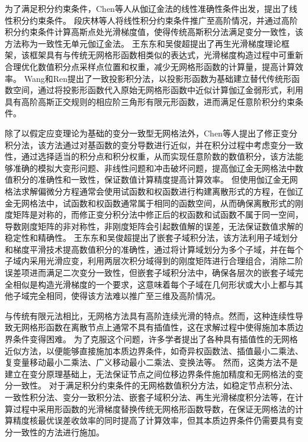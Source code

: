 为了满足积分约束条件，Chen等人从伽辽金法的线性准确性条件出发，提出了线性积分约束条件\textsuperscript{\cite{chen2001}}。
段庆林等人\textsuperscript{\cite{陈嵩涛2020几何非线性分析的高效高阶无网格法,duan2012}}将线性积分约束条件推广至高阶情况，并通过高阶积分约束条件计算高斯点处光滑梯度值，使得传统高斯积分法满足变分一致性，该方法称为一致性无单元伽辽金法。
王东东和吴俊超提出了再生光滑梯度理论框架\textsuperscript{\cite{wang2019}}，该框架具有与传统无网格形函数相类似的表达式，光滑梯度构造过程中可重新合理优化数值积分点采样点位置和权重，减少无网格形函数的计算量，提高计算效率。
Wang和Ren\textsuperscript{\cite{wang2023}}提出了一致投影积分法，以投影形函数为基础建立替代传统形函数空间，通过将投影形函数代入原始无网格形函数中近似计算伽辽金弱形式，利用具有高阶高斯正交规则的相应阶三角形有限元形函数，进而满足任意阶积分约束条件。\par
除了以假定应变理论为基础的变分一致型无网格法外，Chen等人\textsuperscript{\cite{chen1996}}提出了修正变分积分法，该方法通过对基函数的变分导数进行近似，并在积分过程中考虑变分一致性，通过选择适当的积分点和积分权重，从而实现任意阶数的数值积分，该方法能够准确的模拟大变形问题、非线性问题和冲击破坏问题，提高伽辽金无网格法中数值积分的准确性和一致性，保证数值计算精度提高计算效率。
但使用伽辽金无网格法求解偏微分方程通常会使用试函数和权函数进行构建离散形式的方程，在伽辽金无网格法中，试函数和权函数通常属于相同的函数空间，从而确保离散形式的刚度矩阵是对称的，而修正变分积分法中修正后的权函数和试函数不属于同一空间，导数刚度矩阵的非对称性，非刚度矩阵会引起数值解的误差，无法保证数值求解的稳定性和精确性。
王东东和吴俊超提出了嵌套子域积分法\textsuperscript{\cite{wang2016}}，该方法利用子域划分和梯度平滑技术提高数值积分的准确性，通过将计算域划分为多个子域，并在每个子域内采用光滑应变，利用两层次积分域得到的刚度矩阵进行合理组合，消除二阶误差项进而满足二次变分一致性，但嵌套子域积分法中，确保各层次的嵌套子域完全相似是构造光滑梯度的一个要求，这意味着每个子域在几何形状或大小上都与其他子域完全相同，使得该方法难以推广至三维及高阶情况。
\par
与传统有限元法相比，无网格方法具有高阶连续光滑的特点。然而，这种连续性导致无网格形函数在离散节点上通常不具有插值性，这在求解过程中使得施加本质边界条件变得困难。
为了克服这个问题，许多学者提出了各种具有插值性的无网格近似方法，以便能够直接施加本质边界条件\textsuperscript{\cite{CaoYang2020,fernandez-mendez2004}}，如奇异权函数法\textsuperscript{\cite{kaljevic1997}}、插值最小二乘法\textsuperscript{\cite{liu2019,ChenXinXin2021}}、复变量移动最小二乘法\textsuperscript{\cite{ChengYuMin2005}}、广义移动最小二乘法\textsuperscript{\cite{HuangJuan2007}}、变换法\textsuperscript{\cite{chen2000}}等。
然而，这类方法不是建立在变分原理基础上，无法保证节点之间位移边界条件施加精度和无网格法的变分一致性。
对于满足积分约束条件的无网格数值积分方法，如稳定节点积分法\textsuperscript{\cite{chen2001}}、一致性积分法\textsuperscript{\cite{陈嵩涛2020几何非线性分析的高效高阶无网格法,duan2012}}、变分一致积分法\textsuperscript{\cite{chen2013}}、嵌套子域积分法\textsuperscript{\cite{wang2016}}、再生光滑梯度积分法\textsuperscript{\cite{wang2019}}等，在计算过程中采用形函数的光滑梯度替换传统无网格形函数导数，在保证无网格法的计算精度核最优误差收敛率的同时提高了计算效率，但其本质边界条件仍需要具有变分一致性的方法进行施加\textsuperscript{\cite{WuJunChao2016,hillman2021}}。

